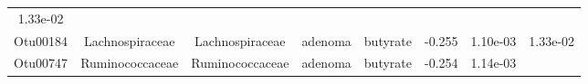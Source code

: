 \documentclass[11pt,]{article}
\begin{document}
\begin{longtable}[]{@{}cccccccc@{}}
\begin{minipage}[t]{0.08\columnwidth}
1.33e-02\strut
\end{minipage}\tabularnewline
\begin{minipage}[t]{0.08\columnwidth}\centering\strut
Otu00184\strut
\end{minipage} & \begin{minipage}[t]{0.15\columnwidth}\centering\strut
Lachnospiraceae\strut
\end{minipage} & \begin{minipage}[t]{0.15\columnwidth}\centering\strut
Lachnospiraceae\strut
\end{minipage} & \begin{minipage}[t]{0.08\columnwidth}\centering\strut
adenoma\strut
\end{minipage} & \begin{minipage}[t]{0.09\columnwidth}\centering\strut
butyrate\strut
\end{minipage} & \begin{minipage}[t]{0.07\columnwidth}\centering\strut
-0.255\strut
\end{minipage} & \begin{minipage}[t]{0.08\columnwidth}\centering\strut
1.10e-03\strut
\end{minipage} & \begin{minipage}[t]{0.08\columnwidth}\centering\strut
1.33e-02\strut
\end{minipage}\tabularnewline
\begin{minipage}[t]{0.08\columnwidth}\centering\strut
Otu00747\strut
\end{minipage} & \begin{minipage}[t]{0.15\columnwidth}\centering\strut
Ruminococcaceae\strut
\end{minipage} & \begin{minipage}[t]{0.15\columnwidth}\centering\strut
Ruminococcaceae\strut
\end{minipage} & \begin{minipage}[t]{0.08\columnwidth}\centering\strut
adenoma\strut
\end{minipage} & \begin{minipage}[t]{0.09\columnwidth}\centering\strut
butyrate\strut
\end{minipage} & \begin{minipage}[t]{0.07\columnwidth}\centering\strut
-0.254\strut
\end{minipage} & \begin{minipage}[t]{0.08\columnwidth}\centering\strut
1.14e-03\strut
\end{minipage} & \begin{minipage}[t]{0.08\columnwidth}\centering\strut

\end{minipage}
\end{longtable}
\end{document}
